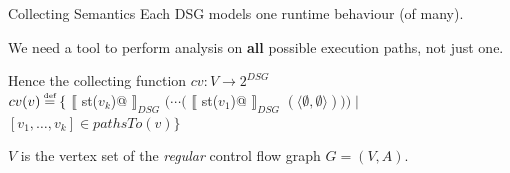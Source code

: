 \documentclass[xcolor={usenames,dvipsnames}]{beamer}
\makeatletter
\newcommand\defeq{\stackrel{\mathclap{\tiny\mbox{def}}}{=}}
\newcommand{\transformer}[2]{$\llbracket$ \lstinline@#1@ $\rrbracket_{#2}$}
\newcommand{\transformerDSG}[1]{\transformer{#1}{DSG}}
\makeatother
\begin{document}
\begin{frame}[fragile]{Collecting Semantics}
  Each DSG models one runtime behaviour (of many).
  
  \vspace{1em}
  
  We need a tool to perform analysis on \textbf{all} possible execution paths, not just one.
  
  \vspace{2em}
  
  Hence the collecting function $cv: V \to 2^{DSG}$ \\
  $cv(v) \defeq \{ $ \transformerDSG{st($v_k$)} $ ( \cdots ( $ \transformerDSG{st($v_1$)} $ ( \langle \emptyset, \emptyset \rangle ))) \mid $ \\
  \hspace{16em} $ \left[ v_1, \ldots, v_k \right] \in pathsTo(v) \} $ 
  
  \vspace{2em}
  
  $V$ is the vertex set of the \textit{regular} control flow graph $G = (V, A)$.
\end{frame}



\end{document}
